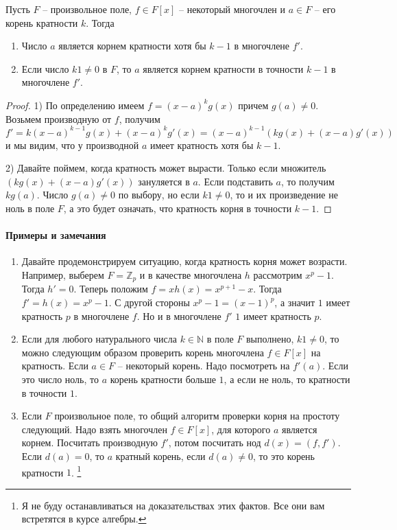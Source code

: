 \begin{claim}
Пусть $F$ -- произвольное поле, $f\in F[x]$ -- некоторый многочлен и $a\in F$ -- его корень кратности $k$.
Тогда 
\begin{enumerate}
\item Число $a$ является корнем кратности хотя бы $k-1$ в многочлене $f'$.

\item Если число $k 1 \neq 0$ в $F$, то $a$ является корнем кратности в точности $k - 1$ в многочлене $f'$.
\end{enumerate}
\end{claim}
\begin{proof}
1) По определению имеем $f = (x - a)^k g(x)$ причем $g(a) \neq 0$.
Возьмем производную от $f$, получим
\[
f' = k(x-a)^{k-1}g(x) + (x-a)^k g'(x) = (x-a)^{k-1}(kg(x) + (x-a)g'(x))
\]
и мы видим, что у производной $a$ имеет кратность хотя бы $k-1$.


2) Давайте поймем, когда кратность может вырасти.
Только если множитель $(kg(x) + (x-a)g'(x))$ зануляется в $a$.
Если подставить $a$, то получим $kg(a)$.
Число $g(a)\neq 0$ по выбору, но если $k 1\neq 0$, то и их произведение не ноль в поле $F$, а это будет означать, что кратность корня в точности $k - 1$.
\end{proof}

\paragraph{Примеры и замечания}

\begin{enumerate}
\item
Давайте продемонстрируем ситуацию, когда кратность корня может возрасти.
Например, выберем $F = \mathbb Z_p$ и в качестве многочлена $h$ рассмотрим $x^p - 1$.
Тогда $h' = 0$.
Теперь положим $f = xh(x) = x^{p+1}- x$.
Тогда $f' = h(x) = x^p - 1$.
С другой стороны $x^p - 1 = (x-1)^p$, а значит $1$ имеет кратность $p$ в многочлене $f$.
Но и в многочлене $f'$ $1$ имеет кратность $p$.

\item Если для любого натурального числа $k\in \mathbb N$ в поле $F$ выполнено, $k 1 \neq 0$, то можно следующим образом проверить корень многочлена $f\in F[x]$ на кратность.
Если $a\in F$ -- некоторый корень.
Надо посмотреть на $f'(a)$.
Если это число ноль, то $a$ корень кратности больше $1$, а если не ноль, то кратности в точности $1$.

\item Если $F$ произвольное поле, то общий алгоритм проверки корня на простоту следующий.
Надо взять многочлен $f\in F[x]$, для которого $a$ является корнем.
Посчитать производную $f'$, потом посчитать нод $d(x) = (f, f')$.
Если $d(a) = 0$, то $a$ кратный корень, если $d(a) \neq 0$, то это корень кратности $1$.%
\footnote{Я не буду останавливаться на доказательствах этих фактов.
Все они вам встретятся в курсе алгебры.}
\end{enumerate}



